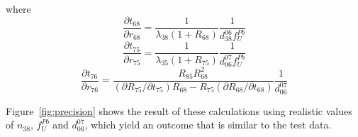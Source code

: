 \documentclass[gchron, manuscript]{copernicus}
\begin{document}
where
\begin{equation}
    \frac{\partial{t_{68}}}{\partial{r_{68}}} = 
    \frac{1}{\lambda_{38}(1+R_{68})} \frac{1}{d^{06}_{38}f^{Pb}_{U}}
\end{equation}
\begin{equation}  
    \frac{\partial{t_{75}}}{\partial{r_{75}}} = 
    \frac{1}{\lambda_{35}(1+R_{75})} \frac{1}{d^{07}_{06}f^{Pb}_{U}}
\end{equation}
\begin{equation}  
  \frac{\partial{t_{76}}}{\partial{r_{76}}} =
  \frac{R_{85}R_{68}^2}
       {(\partial{R_{75}}/\partial{t_{75}})R_{68} -
         R_{75}(\partial{R_{68}}/\partial{t_{68}})}
       \frac{1}{d^{07}_{06}}
\end{equation}

Figure~\ref{fig:precision} shows the result of these calculations
using realistic values of $n_{38}$, $f^{Pb}_{U}$ and $d^{07}_{06}$,
which yield an outcome that is similar to the test data.

\noappendix       %








\end{document}
